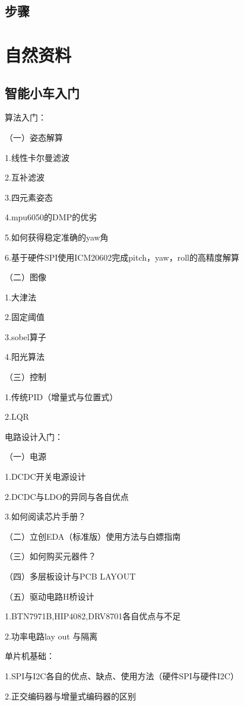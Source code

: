 \documentclass[cn,12pt]{elegantbook}
\begin{document}
\section{步骤}



\appendix

\chapter{自然资料}

\section{智能小车入门}
算法入门：

（一）姿态解算

	1.线性卡尔曼滤波

	2.互补滤波

	3.四元素姿态

	4.mpu6050的DMP的优劣

	5.如何获得稳定准确的yaw角

	6.基于硬件SPI使用ICM20602完成pitch，yaw，roll的高精度解算

（二）图像

	1.大津法

	2.固定阈值

	3.sobel算子

	4.阳光算法

（三）控制

	1.传统PID（增量式与位置式）

	2.LQR

电路设计入门：

（一）电源

	1.DCDC开关电源设计

	2.DCDC与LDO的异同与各自优点

	3.如何阅读芯片手册？

（二）立创EDA（标准版）使用方法与白嫖指南

（三）如何购买元器件？

（四）多层板设计与PCB LAYOUT

（五）驱动电路H桥设计

	1.BTN7971B,HIP4082,DRV8701各自优点与不足

	2.功率电路lay out 与隔离

单片机基础：

1.SPI与I2C各自的优点、缺点、使用方法（硬件SPI与硬件I2C）

2.正交编码器与增量式编码器的区别
\end{document}
